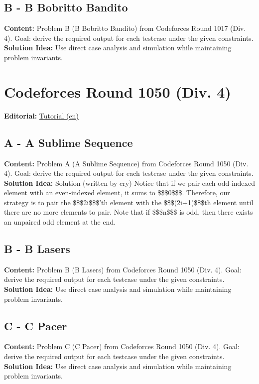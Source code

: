 \documentclass[11pt]{article}
\begin{document}
\subsection{B - B Bobritto Bandito}
\textbf{Content:} Problem B (B Bobritto Bandito) from Codeforces Round 1017 (Div. 4). Goal: derive the required output for each testcase under the given constraints.\\
\textbf{Solution Idea:} Use direct case analysis and simulation while maintaining problem invariants.

\section{Codeforces Round 1050 (Div. 4)}
\textbf{Editorial:} \href{https://codeforces.com/blog/entry/146112}{Tutorial (en)}

\subsection{A - A Sublime Sequence}
\textbf{Content:} Problem A (A Sublime Sequence) from Codeforces Round 1050 (Div. 4). Goal: derive the required output for each testcase under the given constraints.\\
\textbf{Solution Idea:} Solution (written by cry) Notice that if we pair each odd-indexed element with an even-indexed element, it sums to \$\$\$0\$\$\$. Therefore, our strategy is to pair the \$\$\$2i\$\$\$'th element with the \$\$\$(2i+1)\$\$\$th element until there are no more elements to pair. Note that if \$\$\$n\$\$\$ is odd, then there exists an unpaired odd element at the end.

\subsection{B - B Lasers}
\textbf{Content:} Problem B (B Lasers) from Codeforces Round 1050 (Div. 4). Goal: derive the required output for each testcase under the given constraints.\\
\textbf{Solution Idea:} Use direct case analysis and simulation while maintaining problem invariants.

\subsection{C - C Pacer}
\textbf{Content:} Problem C (C Pacer) from Codeforces Round 1050 (Div. 4). Goal: derive the required output for each testcase under the given constraints.\\
\textbf{Solution Idea:} Use direct case analysis and simulation while maintaining problem invariants.
\end{document}
